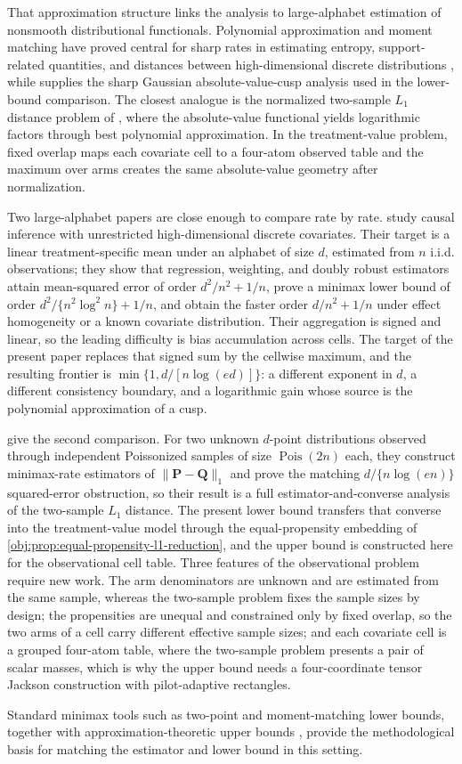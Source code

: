 That approximation structure links the analysis to large-alphabet estimation of nonsmooth distributional functionals. Polynomial approximation and moment matching have proved central for sharp rates in estimating entropy, support-related quantities, and distances between high-dimensional discrete distributions \citep{JiaoVenkatHanWeissman2015Functionals,Wu2016,HanJiaoWeissman2018Local,Valiant2017}, while \citet{CaiLow2011L1} supplies the sharp Gaussian absolute-value-cusp analysis used in the lower-bound comparison. The closest analogue is the normalized two-sample \(L_1\) distance problem of \citet{JiaoHanWeissman2018L1}, where the absolute-value functional yields logarithmic factors through best polynomial approximation. In the treatment-value problem, fixed overlap maps each covariate cell to a four-atom observed table and the maximum over arms creates the same absolute-value geometry after normalization.

Two large-alphabet papers are close enough to compare rate by rate. \citet{ZengBalakrishnanHanKennedy2024Discrete} study causal inference with unrestricted high-dimensional discrete covariates. Their target is a linear treatment-specific mean under an alphabet of size \(d\), estimated from \(n\) i.i.d. observations; they show that regression, weighting, and doubly robust estimators attain mean-squared error of order \(d^{2}/n^{2}+1/n\), prove a minimax lower bound of order \(d^{2}/\{n^{2}\log^{2}n\}+1/n\), and obtain the faster order \(d/n^{2}+1/n\) under effect homogeneity or a known covariate distribution. Their aggregation is signed and linear, so the leading difficulty is bias accumulation across cells. The target of the present paper replaces that signed sum by the cellwise maximum, and the resulting frontier is \(\min\{1,d/[n\log(ed)]\}\): a different exponent in \(d\), a different consistency boundary, and a logarithmic gain whose source is the polynomial approximation of a cusp.

\citet{JiaoHanWeissman2018L1} give the second comparison. For two unknown \(d\)-point distributions observed through independent Poissonized samples of size \(\operatorname{Pois}(2n)\) each, they construct minimax-rate estimators of \(\|\mathbf P-\mathbf Q\|_1\) and prove the matching \(d/\{n\log(en)\}\) squared-error obstruction, so their result is a full estimator-and-converse analysis of the two-sample \(L_1\) distance. The present lower bound transfers that converse into the treatment-value model through the equal-propensity embedding of \cref{obj:prop:equal-propensity-l1-reduction}, and the upper bound is constructed here for the observational cell table. Three features of the observational problem require new work. The arm denominators are unknown and are estimated from the same sample, whereas the two-sample problem fixes the sample sizes by design; the propensities are unequal and constrained only by fixed overlap, so the two arms of a cell carry different effective sample sizes; and each covariate cell is a grouped four-atom table, where the two-sample problem presents a pair of scalar masses, which is why the upper bound needs a four-coordinate tensor Jackson construction with pilot-adaptive rectangles.

Standard minimax tools such as two-point and moment-matching lower bounds, together with approximation-theoretic upper bounds \citep{LeCam1986,Tsybakov2009,DeVore1993}, provide the methodological basis for matching the estimator and lower bound in this setting.
